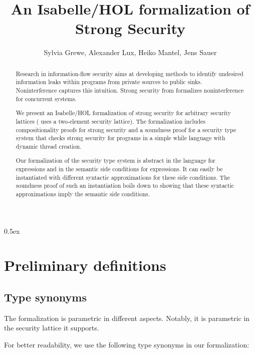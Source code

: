 \documentclass[11pt,a4paper]{article}
\begin{document}
\title{An Isabelle/HOL formalization of Strong Security}
\author{Sylvia Grewe, Alexander Lux, Heiko Mantel, Jens Sauer}
\maketitle

\begin{abstract}
  Research in information-flow security aims at developing methods to
  identify undesired information leaks within programs from private
  sources to public sinks. Noninterference captures this
  intuition. Strong security from \cite{sabelfeld2000probabilistic}
  formalizes noninterference for concurrent systems.

  We present an Isabelle/HOL formalization of strong security for
  arbitrary security lattices (\cite{sabelfeld2000probabilistic} uses
  a two-element security lattice). The formalization includes
  compositionality proofs for strong security and a soundness proof
  for a security type system that checks strong security for programs
  in a simple while language with dynamic thread creation.

  Our formalization of the security type system is abstract in the
  language for expressions and in the semantic side conditions for
  expressions. It can easily be instantiated with different syntactic
  approximations for these side conditions. The soundness proof of
  such an instantiation boils down to showing that these syntactic
  approximations imply the semantic side conditions.
\end{abstract}

\tableofcontents

\parindent 0pt\parskip 0.5ex

%

\section{Preliminary definitions}

\subsection{Type synonyms}

The formalization is parametric in different aspects. Notably, it is
parametric in the security lattice it supports. 

For better readability, we use the following type synonyms in our formalization:
\end{document}
